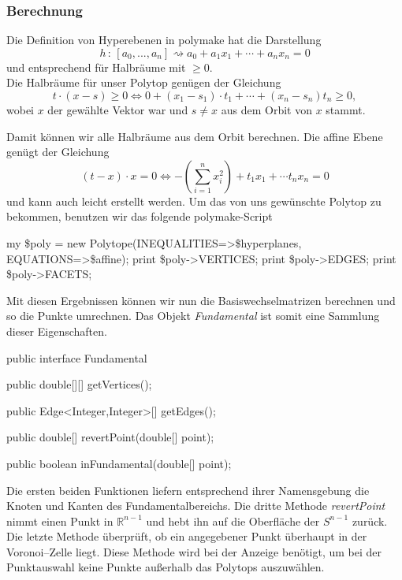        \subsubsection*{Berechnung}

         Die Definition von Hyperebenen in polymake hat die Darstellung
         $$
            h \, : \, [a_0, ..., a_n] \rightsquigarrow a_0 + a_1 x_1 + \cdots + a_n x_n = 0
         $$
         und entsprechend für Halbräume mit $\geq 0$.\\

         \noindent Die Halbräume für unser Polytop genügen der Gleichung
         $$
            t \cdot (x - s) \geq 0 \Leftrightarrow 0 + (x_1-s_1)\cdot t_1 + \cdots + (x_n -s_n)t_n \geq 0,
         $$
         wobei $x$ der gewählte Vektor war und $s \not= x$ aus dem Orbit von $x$ stammt.

         \noindent Damit können wir alle Halbräume aus dem Orbit berechnen. Die affine Ebene genügt der Gleichung
         $$
            (t - x) \cdot x = 0 \Leftrightarrow - \left( \sum_{i=1}^n x_i^2 \right) + t_1 x_1 + \cdots t_n x_n = 0
         $$
         und kann auch leicht erstellt werden. Um das von uns gewünschte Polytop zu bekommen, benutzen wir das folgende polymake-Script

         \begin{code}
            my \$poly = new Polytope(INEQUALITIES=>\$hyperplanes, EQUATIONS=>\$affine);
            print \$poly->VERTICES;
            print \$poly->EDGES;
            print \$poly->FACETS;
         \end{code}

         \noindent Mit diesen Ergebnissen können wir nun die Basiswechselmatrizen berechnen und so die Punkte umrechnen. Das Objekt \emph{Fundamental} ist somit
         eine Sammlung dieser Eigenschaften.

         \begin{code}
            public interface Fundamental {
               public double[][] getVertices();
               
               public Edge<Integer,Integer>[] getEdges();

               public double[] revertPoint(double[] point);

               public boolean inFundamental(double[] point);
            }
         \end{code}
         
         \noindent Die ersten beiden Funktionen liefern entsprechend ihrer Namensgebung die Knoten und Kanten des Fundamentalbereichs. Die dritte Methode \emph{revertPoint} nimmt einen Punkt in $\mathbb{R}^{n-1}$ und
         hebt ihn auf die Oberfläche der $S^{n-1}$ zurück. Die letzte Methode überprüft, ob ein angegebener Punkt überhaupt in der Voronoi--Zelle liegt.
         Diese Methode wird bei der Anzeige benötigt, um bei der Punktauswahl keine Punkte außerhalb das Polytops auszuwählen.\\

